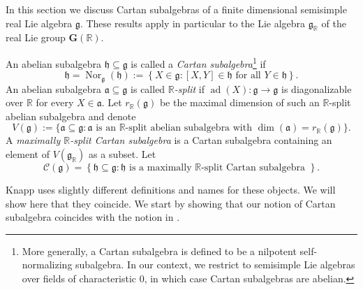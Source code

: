 \documentclass[12pt]{amsart}
\newcommand{\R}{\mathbb{R} }
\newcommand{\frakg}{\mathfrak{g}}
\newcommand{\fraka}{\mathfrak{a}}
\newcommand{\frakh}{\mathfrak{h}}
\newcommand{\bG}{\mathbf{G}}
\numberwithin{equation}{section}
\theoremstyle{remark} %
\begin{document}
In this section we discuss Cartan subalgebras of a finite dimensional semisimple real Lie algebra $\frakg$. These results apply in particular to the Lie algebra $\frakg_\R$ of the real Lie group $\bG(\R)$. 

An abelian subalgebra $\frakh \subseteq \frakg$ is called a \emph{Cartan subalgebra}\footnote{More generally, a Cartan subalgebra is defined to be a nilpotent self-normalizing subalgebra. In our context, we restrict to semisimple Lie algebras over fields of characteristic $0$, in which case Cartan subalgebras are abelian. } 
 if 
$$
\frakh = \operatorname{Nor}_{\frakg}(\frakh) := \left\{ X \in \frakg \colon [X,Y] \in \frakh \text{ for all } Y \in \frakh \right\}.
$$
An abelian subalgebra $\fraka \subseteq \frakg$ is called \emph{$\R$-split} if $\operatorname{ad}(X)\colon \frakg \to\frakg$ is diagonalizable over $\R$ for every $X \in \fraka$. Let $r_\R(\frakg)$ be the maximal dimension of such an $\R$-split abelian subalgebra and denote
$$
V(\frakg) := \{ \fraka \subseteq \frakg \colon \text{$\fraka$ is an $\R$-split abelian subalgebra with $\dim(\fraka) = r_\R(\frakg)$}\}.
$$ 
A \emph{maximally $\R$-split Cartan subalgebra}
is a Cartan subalgebra containing an element of $V(\frakg_\R)$ as a subset. Let
$$
\mathcal{C} (\frakg) = \left\{  \frakh \subseteq \frakg \colon \frakh \text{ is a maximally $\R$-split Cartan subalgebra } \right\}.
$$

Knapp \cite{Kna} uses slightly different definitions and names for these objects. We will show here that they coincide. We start by showing that our notion of Cartan subalgebra coincides with the notion in \cite{Kna}.
\end{document}
